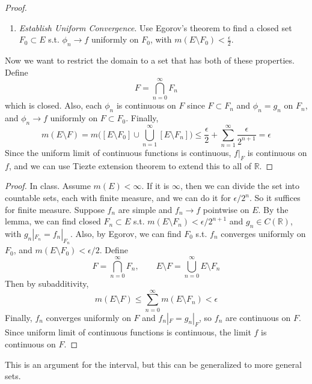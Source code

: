 \begin{proof}
\begin{enumerate}
      \item \textit{Establish Uniform Convergence}. Use Egorov's theorem to find a closed set $F_0 \subset E$  s.t. $\phi_n \to f$ uniformly on $F_0$, with $m(E \setminus F_0) < \frac{\epsilon}{2}$. 
    \end{enumerate}
    Now we want to restrict the domain to a set that has both of these properties. Define 
    \begin{equation}
      F = \bigcap_{n=0}^\infty F_n
    \end{equation}
    which is closed. Also, each $\phi_n$ is continuous on $F$ since $F \subset F_n$ and $\phi_n = g_n$ on $F_n$, and $\phi_n \to f$ uniformly on $F \subset F_0$. Finally, 
    \begin{equation}
      m(E \setminus F) = m \bigg( [E \setminus F_0] \cup \bigcup_{n=1}^\infty [E \setminus F_n] \bigg) \leq \frac{\epsilon}{2} + \sum_{n=1}^\infty \frac{\epsilon}{2^{n+1}} = \epsilon
    \end{equation}
    Since the uniform limit of continuous functions is continuous, $f |_F$ is continuous on $f$, and we can use Tiezte extension theorem to extend this to all of $\mathbb{R}$. 
  \end{proof}
  \begin{proof}
    In class. Assume $m(E) < \infty$. If it is $\infty$, then we can divide the set into countable sets, each with finite measure, and we can do it for $\epsilon/2^{n}$. So it suffices for finite measure. Suppose $f_n$ are simple and $f_n \to f$ pointwise on $E$. By the lemma, we can find closed $F_n \subset E$ s.t. $m(E \setminus F_n) < \epsilon / 2^{n+1}$ and $g_n \in C(\mathbb{R})$, with $g_n |_{F_n} = f_n |_{F_n}$. Also, by Egorov, we can find $F_0$ s.t. $f_n$ converges uniformly on $F_0$, and $m(E \setminus F_0) < \epsilon / 2$. Define 
    \begin{equation}
      F = \bigcap_{n=0}^\infty F_n, \qquad E \setminus F = \bigcup_{n=0}^\infty E \setminus F_n
    \end{equation}
    Then by subadditivity,
    \begin{equation}
      m(E \setminus F) \leq \sum_{n=0}^\infty m(E \setminus F_n) < \epsilon
    \end{equation}
    Finally, $f_n$ converges uniformly on $F$ and $f_n |_F = g_n |_F$, so $f_n$ are continuous on $F$. Since uniform limit of continuous functions is continuous, the limit $f$ is continuous on $F$. 
  \end{proof}

  This is an argument for the interval, but this can be generalized to more general sets. 

